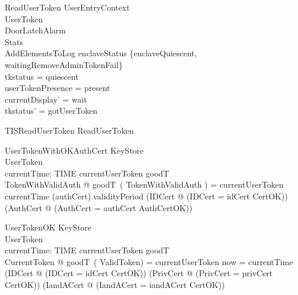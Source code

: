 \begin{schema}{ReadUserToken}
  UserEntryContext\\
  \Xi UserToken\\
  \Xi DoorLatchAlarm\\
  \Xi Stats\\
  AddElementsToLog
\where
  enclaveStatus \in  \{enclaveQuiescent, waitingRemoveAdminTokenFail\}\\
  tkstatus = quiescent\\
  userTokenPresence = present\\
  currentDisplay' = wait\\
  tkstatus' = gotUserToken
\end{schema}

\begin{zed}
TISReadUserToken  ReadUserToken
\end{zed}

\begin{schema}{UserTokenWithOKAuthCert}
  KeyStore\\
  UserToken\\
  currentTime: TIME
\where
  currentUserToken \in  \ran  goodT\\
  \exists  TokenWithValidAuth @ goodT~( \theta  TokenWithValidAuth ) = currentUserToken \land  currentTime \in  (\The authCert).validityPeriod \land  (\exists  IDCert @ (\theta  IDCert = idCert \land  CertOK)) \land  (\exists  AuthCert @ (\theta  AuthCert = \The authCert \land  AuthCertOK))
\end{schema}


\begin{schema}{UserTokenOK}
  KeyStore\\
  UserToken\\
  currentTime: TIME
\where
  currentUserToken \in  \ran  goodT\\
  \exists  CurrentToken @ goodT~( \theta  ValidToken) = currentUserToken \land  now = currentTime \land  (\exists  IDCert @ (\theta  IDCert = idCert \land  CertOK)) \land  (\exists  PrivCert @ (\theta  PrivCert = privCert \land  CertOK)) \land  (\exists  IandACert @ (\theta  IandACert = iandACert \land  CertOK))
\end{schema}

